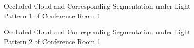 \documentclass[11pt, a4paper,oneside,chapterprefix=false]{scrbook}
\begin{document}
\begin{figure}[H]
    \centering
      \label{fig:conf1 0 occluded} \hfill
     \label{fig:conf1 0 seg}
    \caption{Occluded Cloud and Corresponding Segmentation under Light Pattern 1 of Conference Room 1}
    \label{fig:conf1 0 occ and seg}
\end{figure}

\begin{figure}[H]
    \centering
      \label{fig:conf1 4 occluded} \hfill
     \label{fig:conf1 4 seg}
    \caption{Occluded Cloud and Corresponding Segmentation under Light Pattern 2 of Conference Room 1}
    \label{fig:conf1 4 occ and seg}
\end{figure}
\end{document}

